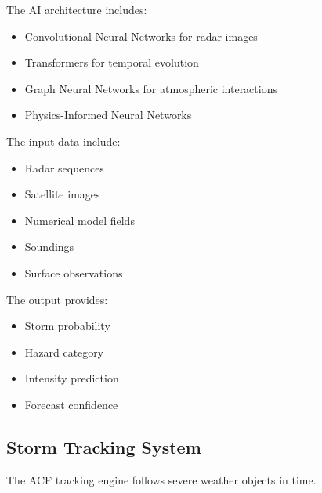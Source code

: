 The AI architecture includes:

\begin{itemize}

\item Convolutional Neural Networks for radar images

\item Transformers for temporal evolution

\item Graph Neural Networks for atmospheric interactions

\item Physics-Informed Neural Networks

\end{itemize}


The input data include:

\begin{itemize}

\item Radar sequences

\item Satellite images

\item Numerical model fields

\item Soundings

\item Surface observations

\end{itemize}


The output provides:

\begin{itemize}

\item Storm probability

\item Hazard category

\item Intensity prediction

\item Forecast confidence

\end{itemize}



\subsection{Storm Tracking System}

The ACF tracking engine follows severe weather objects in time.

